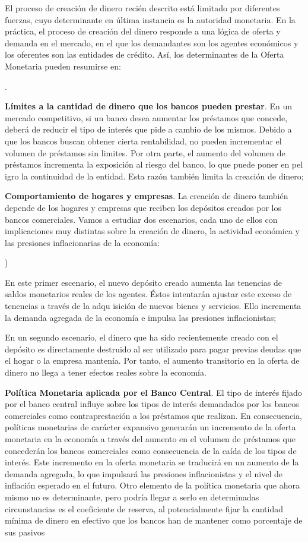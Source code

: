 \documentclass[10pt,a4paper]{article}
\newcounter{alphaitem}
\newcounter{numitem}
\newenvironment{la}
      {\begin{list}{\alph{alphaitem})}{%
          \usecounter{alphaitem}%
          \setlength{\leftmargin}{1cm}%
          \setlength{\parskip}{3pt}%
          \setlength{\itemsep}{0pt}%
          \setlength{\parsep}{0pt}%
      }}
      {\end{list}}
\newenvironment{lnum}
      {\begin{list}{\arabic{numitem}.}{%
          \usecounter{numitem}%
          \setlength{\leftmargin}{1cm}%
          \setlength{\parskip}{3pt}%
          \setlength{\itemsep}{0pt}%
          \setlength{\parsep}{0pt}%
      }}
      {\end{list}}
\begin{document}
El proceso de creación de dinero recién descrito está limitado por diferentes fuerzas, cuyo determinante en última instancia es la autoridad monetaria. En la práctica, el proceso de creación del dinero responde a una lógica de oferta y demanda en el mercado, en el que los demandantes son los agentes económicos y los oferentes son las entidades de crédito. Así, los determinantes de la Oferta Monetaria pueden resumirse en:
\begin{lnum}
    \item \textbf{Límites a la cantidad de dinero que los bancos pueden prestar}. En un mercado competitivo, si un banco desea aumentar los préstamos que concede, deberá de reducir el tipo de interés que pide a cambio de los mismos. Debido a que los bancos buscan obtener cierta rentabilidad, no pueden incrementar el volumen de préstamos sin limites. Por otra parte, el aumento del volumen de préstamos incrementa la exposición al riesgo del banco, lo que puede poner en pel igro la continuidad de la entidad. Esta razón también limita la creación de dinero;
    \item \textbf{Comportamiento de hogares y empresas}. La creación de dinero también depende de los hogares y empresas que reciben los depósitos creados por los bancos comerciales. Vamos a estudiar dos escenarios, cada uno de ellos con implicaciones muy distintas sobre la creación de dinero, la actividad económica y las presiones inflacionarias de la economía:
    \begin{la}
        \item En este primer escenario, el nuevo depósito creado aumenta las tenencias de saldos monetarios reales de los agentes. Éstos intentarán ajustar este exceso de tenencias a través de la adqu isición de nuevos bienes y servicios. Ello incrementa la demanda agregada de la economía e impulsa las presiones inflacionistas;
        \item En un segundo escenario, el dinero que ha sido recientemente creado con el depósito es directamente destruido al ser utilizado para pagar previas deudas que el hogar o la empresa mantenía. Por tanto, el aumento transitorio en la oferta de dinero no llega a tener efectos reales sobre la economía.
    \end{la}
    \item \textbf{Política Monetaria aplicada por el Banco Central}. El tipo de interés fijado por el banco central influye sobre los tipos de interés demandados por los bancos comerciales como contraprestación a los préstamos que realizan. En consecuencia, políticas monetarias de carácter expansivo generarán un incremento de la oferta monetaria en la economía a través del aumento en el volumen de préstamos que concederán los bancos comerciales como consecuencia de la caída de los tipos de interés. Este incremento en la oferta monetaria se traducirá en un aumento de la demanda agregada, lo que impulsará las presiones inflacionistas y el nivel de inflación esperado en el futuro. Otro elemento de la política monetaria que ahora mismo no es determinante, pero podría llegar a serlo en determinadas circunstancias es el coeficiente de reserva, al potencialmente fijar la cantidad mínima de dinero en efectivo que los bancos han de mantener como porcentaje de sus pasivos

\end{lnum}
\end{document}
